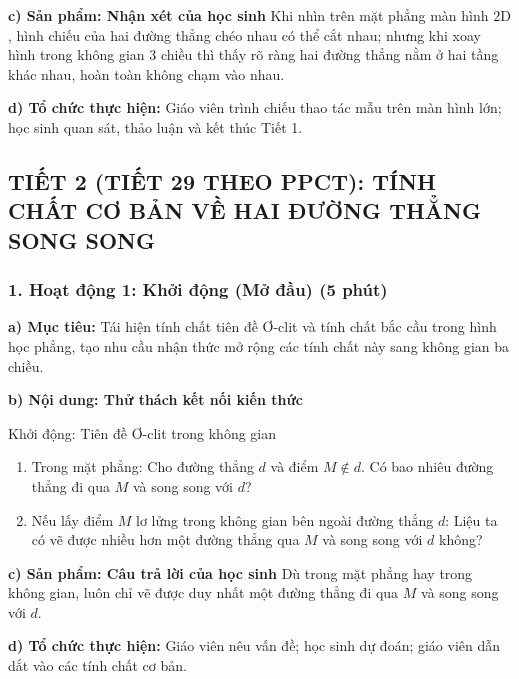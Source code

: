 \documentclass[12pt, a4paper]{article}
\begin{document}
\noindent \textbf{c) Sản phẩm: Nhận xét của học sinh}
Khi nhìn trên mặt phẳng màn hình $2\text{D}$, hình chiếu của hai đường thẳng chéo nhau có thể cắt nhau; nhưng khi xoay hình trong không gian 3 chiều thì thấy rõ ràng hai đường thẳng nằm ở hai tầng khác nhau, hoàn toàn không chạm vào nhau.

\noindent \textbf{d) Tổ chức thực hiện:}
Giáo viên trình chiếu thao tác mẫu trên màn hình lớn; học sinh quan sát, thảo luận và kết thúc Tiết 1.

\newpage
\subsection*{TIẾT 2 (TIẾT 29 THEO PPCT): TÍNH CHẤT CƠ BẢN VỀ HAI ĐƯỜNG THẲNG SONG SONG}

\subsubsection*{1. Hoạt động 1: Khởi động (Mở đầu) (5 phút)}

\noindent \textbf{a) Mục tiêu:}
Tái hiện tính chất tiên đề Ơ-clit và tính chất bắc cầu trong hình học phẳng, tạo nhu cầu nhận thức mở rộng các tính chất này sang không gian ba chiều.

\noindent \textbf{b) Nội dung: Thử thách kết nối kiến thức}
\begin{pedabox}{Khởi động: Tiên đề Ơ-clit trong không gian}
\begin{enumerate}[leftmargin=0.6cm]
    \item Trong mặt phẳng: Cho đường thẳng $d$ và điểm $M \notin d$. Có bao nhiêu đường thẳng đi qua $M$ và song song với $d$?
    \item Nếu lấy điểm $M$ lơ lửng trong không gian bên ngoài đường thẳng $d$: Liệu ta có vẽ được nhiều hơn một đường thẳng qua $M$ và song song với $d$ không?
\end{enumerate}
\end{pedabox}

\noindent \textbf{c) Sản phẩm: Câu trả lời của học sinh}
Dù trong mặt phẳng hay trong không gian, luôn chỉ vẽ được duy nhất một đường thẳng đi qua $M$ và song song với $d$.

\noindent \textbf{d) Tổ chức thực hiện:}
Giáo viên nêu vấn đề; học sinh dự đoán; giáo viên dẫn dắt vào các tính chất cơ bản.
\end{document}
